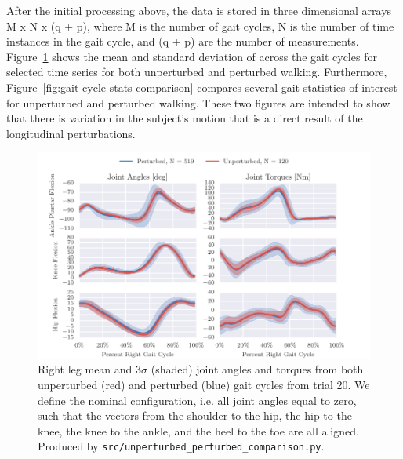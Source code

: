 \documentclass{article}
\begin{document}
After the initial processing above, the data is stored in three dimensional
arrays M x N x (q + p), where M is the number of gait cycles, N is the number of time
instances in the gait cycle, and (q + p) are the number of measurements.
Figure~\ref{fig:angle-torque-comparison} shows the mean and standard deviation
of across the gait cycles for selected time series for both unperturbed and
perturbed walking. Furthermore, Figure~\ref{fig:gait-cycle-stats-comparison}
compares several gait statistics of interest for unperturbed and perturbed
walking. These two figures are intended to show that there is variation in the
subject's motion that is a direct result of the longitudinal perturbations.
%
\begin{figure}
  \centering
  \includegraphics{figures/unperturbed-perturbed-comparison.pdf}
  \cprotect\caption{Right leg mean and $3\sigma$ (shaded) joint angles and
    torques from both unperturbed (red) and perturbed (blue) gait cycles
    from trial 20. We define the nominal configuration, i.e. all joint angles
    equal to zero, such that the vectors from the shoulder to the hip, the hip
    to the knee, the knee to the ankle, and the heel to the toe are all aligned.
    Produced by \verb|src/unperturbed_perturbed_comparison.py|.}
  \label{fig:angle-torque-comparison}
\end{figure}
%
\end{document}
